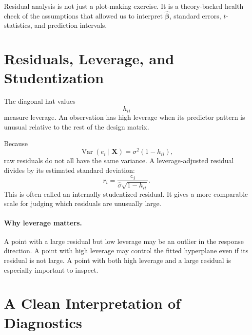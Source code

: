 Residual analysis is not just a plot-making exercise.  It is a theory-backed health check of the assumptions that allowed us to interpret \(\widehat{\boldsymbol{\beta}}\), standard errors, \(t\)-statistics, and prediction intervals.

\section{Residuals, Leverage, and Studentization}

The diagonal hat values
\begin{equation}
  h_{ii}
\end{equation}
measure leverage.  An observation has high leverage when its predictor pattern is unusual relative to the rest of the design matrix.

Because
\begin{equation}
  \operatorname{Var}(e_i\mid\mathbf{X})=\sigma^2(1-h_{ii}),
\end{equation}
raw residuals do not all have the same variance.  A leverage-adjusted residual divides by its estimated standard deviation:
\begin{equation}
  r_i=\frac{e_i}{\widehat{\sigma}\sqrt{1-h_{ii}}}.
\end{equation}
This is often called an internally studentized residual.  It gives a more comparable scale for judging which residuals are unusually large.

\paragraph{Why leverage matters.}
A point with a large residual but low leverage may be an outlier in the response direction.  A point with high leverage may control the fitted hyperplane even if its residual is not large.  A point with both high leverage and a large residual is especially important to inspect.

\section{A Clean Interpretation of Diagnostics}

